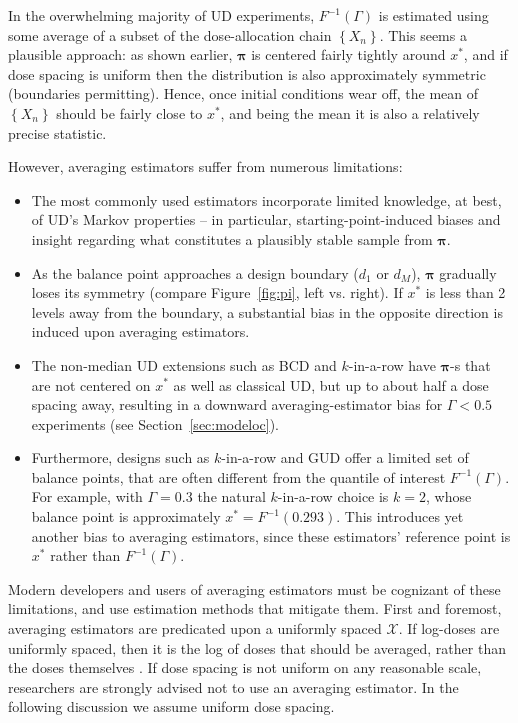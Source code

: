 In the overwhelming majority of UD experiments, $F^{-1}(\Gamma)$ is estimated using some average of a subset of the dose-allocation chain $\left\{X_n\right\}$. This seems a plausible approach: as shown earlier, $\boldsymbol{\pi}$ is centered fairly tightly around $x^*$, and if dose spacing is uniform then the distribution is also approximately symmetric (boundaries permitting). Hence, once initial conditions wear off, the mean of $\left\{X_n\right\}$ should be fairly close to $x^*$, and being the mean it is also a relatively precise statistic.

However, averaging estimators suffer from numerous limitations:

\begin{itemize}
\item The most commonly used estimators incorporate limited knowledge, at best, of UD's Markov properties -- in particular, starting-point-induced biases and insight regarding what constitutes a plausibly stable sample from $\boldsymbol{\pi}$.
\item As the balance point  approaches a design boundary ($d_1$ or $d_M$), $\boldsymbol{\pi}$ gradually loses its symmetry (compare Figure~\ref{fig:pi}, left vs. right).  If  $x^*$ is less than 2 levels away from the boundary, a substantial bias in the opposite direction is induced upon averaging estimators.
\item The non-median UD extensions such as BCD and $k$-in-a-row have $\boldsymbol{\pi}$-s that are not centered on $x^*$ as well as classical UD, but up to about half a dose spacing away, resulting in a downward averaging-estimator bias for $\Gamma<0.5$ experiments (see Section~\ref{sec:modeloc}).
\item Furthermore, designs such as $k$-in-a-row and GUD offer a limited set of balance points, that are often different from the quantile of interest $F^{-1}(\Gamma)$. For example, with $\Gamma=0.3$ the natural $k$-in-a-row choice is $k=2$, whose balance point is approximately $x^*=F^{-1}(0.293)$. This introduces yet another bias to averaging estimators, since these estimators' reference point is $x^*$ rather than $F^{-1}(\Gamma)$.
\end{itemize}

Modern developers and users of averaging estimators must be cognizant of these limitations, and use estimation methods that mitigate them. First and foremost, averaging estimators are predicated upon a uniformly spaced $\mathcal{X}$. If log-doses are uniformly spaced, then it is the log of doses that should be averaged, rather than the doses themselves \citep{Garc:Pere:Forc:1998,Oron07}. If dose spacing is not uniform on any reasonable scale, researchers are strongly advised not to use an averaging estimator. In the following discussion we assume uniform dose spacing.

